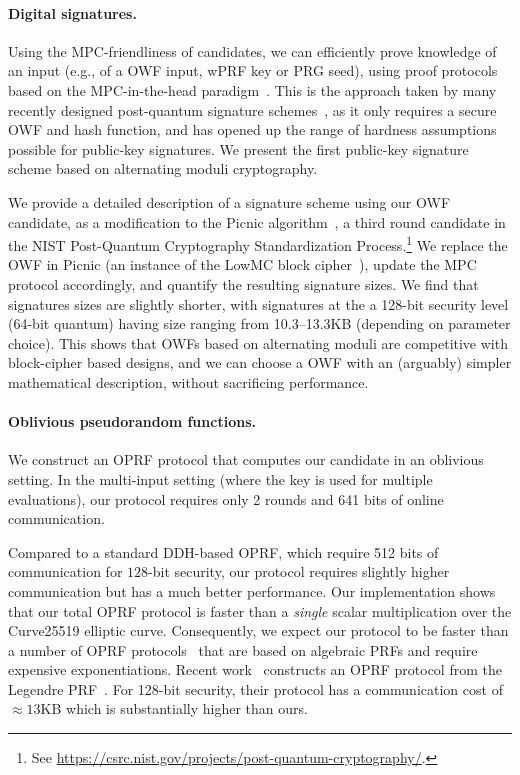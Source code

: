 \paragraph{Digital signatures.} Using the MPC-friendliness of candidates, we can efficiently prove knowledge of
an input (e.g., of a OWF input, wPRF key or PRG seed), using proof protocols
based on the MPC-in-the-head paradigm~\cite{ishai2007-zkmpc}.  This is the approach
taken by many recently designed post-quantum signature
schemes~\cite{chase2017-picnic,katz2018-pqsigs,beullens2020-sigma-mq,beullens2020-legroast,guilhem2019-bbq,banquet},
as it only requires a secure OWF and hash function, and has opened up the range
of hardness assumptions possible for public-key signatures.  We present the
first public-key signature scheme based on alternating moduli cryptography. 

We provide a detailed description of a signature scheme using our OWF candidate,
as a modification to the Picnic
algorithm~\cite{chase2017-picnic,katz2018-pqsigs,kales2020-picnic,picnic-spec}, a
third round candidate in the NIST Post-Quantum Cryptography Standardization
Process.\footnote{See
\url{https://csrc.nist.gov/projects/post-quantum-cryptography/}.} We replace
the OWF in Picnic (an instance of the LowMC block cipher~\cite{albrecht2015-lowmc}),
update the MPC protocol accordingly, and quantify the resulting signature
sizes.  We find that signatures sizes are slightly shorter, with signatures at
the a 128-bit security level (64-bit quantum) having size ranging from 10.3--13.3KB (depending
on parameter choice).  This
shows that OWFs based on alternating moduli are competitive with block-cipher
based designs, and we can choose a OWF with an (arguably) simpler mathematical
description, without sacrificing performance. 

\paragraph{Oblivious pseudorandom functions.} 
We construct an OPRF protocol that computes our \ttwPRF candidate in an oblivious setting. In the multi-input setting (where the key is used for multiple evaluations), our protocol requires only 2 rounds and 641 bits of online communication.

Compared to a standard DDH-based OPRF, which require 512 bits of communication for $128$-bit security, our protocol requires slightly higher communication but has a much better performance. Our implementation shows that our total OPRF protocol is faster than a \textit{single} scalar multiplication over the Curve25519 elliptic curve. Consequently, we expect our protocol to be faster than a number of OPRF protocols~\cite{freedman2005-oprf,jarecki2009-oprf} that are based on algebraic PRFs and require expensive exponentiations. Recent work~\cite{seres2021-legendre} constructs an OPRF protocol from the Legendre PRF~\cite{damgard1988-legendre}. For 128-bit security, their protocol has a communication cost of $\approx 13$KB which is substantially higher than ours.


